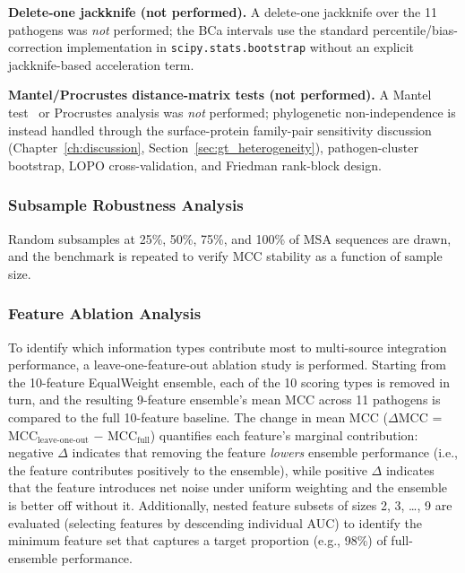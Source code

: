 \textbf{Delete-one jackknife (not performed).}\label{subsubsec:jackknife_acknowledgement} A delete-one jackknife over the 11 pathogens was \emph{not} performed; the BCa intervals use the standard percentile/bias-correction implementation in \texttt{scipy.stats.bootstrap} without an explicit jackknife-based acceleration term.

\textbf{Mantel/Procrustes distance-matrix tests (not performed).}\label{subsubsec:mantel_acknowledgement} A Mantel test~\cite{mantel1967nonparametric} or Procrustes analysis was \emph{not} performed; phylogenetic non-independence is instead handled through the surface-protein family-pair sensitivity discussion (Chapter~\ref{ch:discussion}, Section~\ref{sec:gt_heterogeneity}), pathogen-cluster bootstrap, LOPO cross-validation, and Friedman rank-block design.

\subsubsection{Subsample Robustness Analysis}

Random subsamples at 25\%, 50\%, 75\%, and 100\% of MSA sequences are drawn, and the benchmark is repeated to verify MCC stability as a function of sample size.

\subsubsection{Feature Ablation Analysis}

To identify which information types contribute most to multi-source integration performance, a leave-one-feature-out ablation study is performed.
Starting from the 10-feature EqualWeight ensemble, each of the 10 scoring types is removed in turn, and the resulting 9-feature ensemble's mean MCC across 11 pathogens is compared to the full 10-feature baseline.
The change in mean MCC ($\Delta$MCC = MCC$_{\text{leave-one-out}}$ $-$ MCC$_{\text{full}}$) quantifies each feature's marginal contribution: negative $\Delta$ indicates that removing the feature \emph{lowers} ensemble performance (i.e., the feature contributes positively to the ensemble), while positive $\Delta$ indicates that the feature introduces net noise under uniform weighting and the ensemble is better off without it.
Additionally, nested feature subsets of sizes 2, 3, \ldots, 9 are evaluated (selecting features by descending individual AUC) to identify the minimum feature set that captures a target proportion (e.g., 98\%) of full-ensemble performance.

